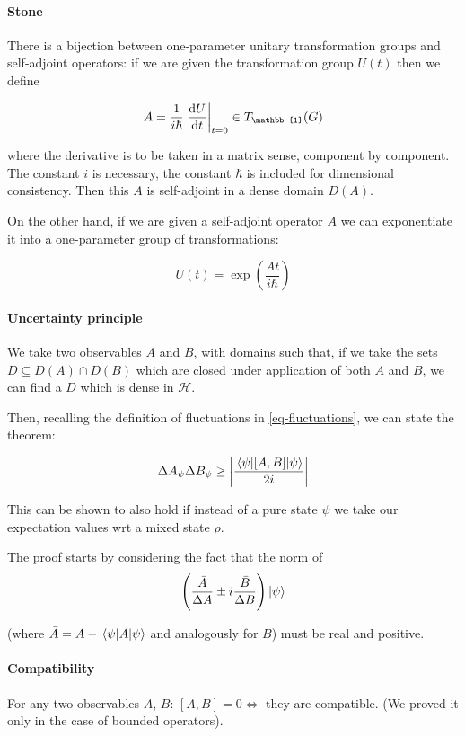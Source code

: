 \documentclass[main.tex]{subfiles}
\begin{document}
\paragraph{Stone} There is a bijection between one-parameter unitary transformation groups and self-adjoint operators: if we are given the transformation group $U(t)$ then we define

\begin{equation}
    A = \frac{1}{i\hbar} \eval{\dv{U}{t}}_{t=0} \in T_\mathbb{1}(G)
\end{equation}

where the derivative is to be taken in a matrix sense, component by component. The constant $i$ is necessary, the constant $\hbar$ is included for dimensional consistency.
Then this $A$ is self-adjoint in a dense domain $D(A)$.

On the other hand, if we are given a self-adjoint operator $A$ we can exponentiate it into a one-parameter group of transformations:

\begin{equation}
    U(t) = \exp(\frac{At}{i\hbar})
\end{equation}

\paragraph{Uncertainty principle}

We take two observables $A$ and $B$, with domains such that, if we take the sets $D \subseteq D(A) \cap D(B)$ which are closed under application of both $A$ and $B$, we can find a $D$ which is dense in $\mathcal{H}$.

Then, recalling the definition of fluctuations in \eqref{eq-fluctuations}, we can state the theorem:

\begin{equation}
    \Delta A_\psi \Delta B_\psi \geq \abs{
    \frac{\ev{[A, B]}{\psi}}{2i}
    }
\end{equation}

This can be shown to also hold if instead of a pure state $\psi$ we take our expectation values wrt a mixed state $\rho$.

The proof starts by considering the fact that the norm of
\[
\qty( \frac{\bar{A}}{\Delta A} \pm i \frac{\bar{B}}{\Delta B}
) \ket{\psi}
\]

(where $\bar{A} = A - \ev{A}{\psi}$ and analogously for $B$)
must be real and positive.

\paragraph{Compatibility} For any two observables $A$, $B$: $[A, B] = 0 \iff $ they are compatible. (We proved it only in the case of bounded operators).
\end{document}
